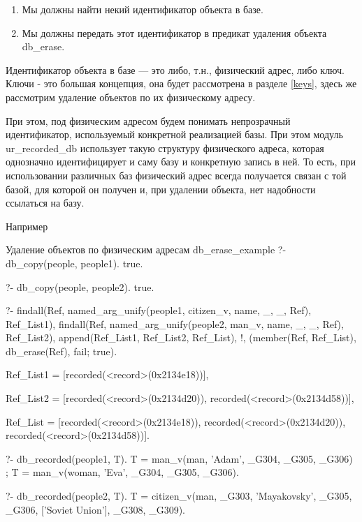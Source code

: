 \documentclass[a4paper]{book}
\def\tn{т.\thinspace н.}
\begin{document}
\begin{enumerate}
\item Мы должны найти некий идентификатор объекта в базе.
\item Мы должны передать этот идентификатор в предикат удаления
  объекта db\_erase.
\end{enumerate}

Идентификатор объекта в базе --- это либо, \tn, физический адрес,
либо ключ. Ключи - это большая концепция, она будет рассмотрена в
разделе \ref{keys}, здесь же рассмотрим удаление объектов по их
физическому адресу.

При этом, под физическим адресом будем понимать непрозрачный
идентификатор, используемый конкретной реализацией базы. При этом
модуль ur\_recorded\_db использует такую структуру физического
адреса, которая однозначно идентифицирует и саму базу и
конкретную запись в ней. То есть, при использовании различных баз
физический адрес всегда получается связан с той базой, для
которой он получен и, при удалении объекта, нет надобности
ссылаться на базу.

Например

\begin{bigexample}{Удаление объектов по физическим адресам}%
               {db_erase_example}
?- db_copy(people, people1).
true.

?- db_copy(people, people2).
true.

?- findall(Ref, 
           named_arg_unify(people1, citizen_v, name, _, _, Ref), 
           Ref_List1), 
   findall(Ref, 
           named_arg_unify(people2, man_v, name, _, _, Ref), 
           Ref_List2), 
   append(Ref_List1, Ref_List2, Ref_List), 
   !, 
   (member(Ref, Ref_List), db_erase(Ref), fail; true).

Ref_List1 = [recorded(<record>(0x2134e18))],

Ref_List2 = [recorded(<record>(0x2134d20)), 
             recorded(<record>(0x2134d58))],

Ref_List = [recorded(<record>(0x2134e18)), 
            recorded(<record>(0x2134d20)), 
            recorded(<record>(0x2134d58))].

?- db_recorded(people1, T).
T = man_v(man, 'Adam', _G304, _G305, _G306) ;
T = man_v(woman, 'Eva', _G304, _G305, _G306).

?- db_recorded(people2, T).                                        
T = citizen_v(man, _G303, 'Mayakovsky', _G305, _G306, 
              ['Soviet Union'], _G308, _G309).
\end{bigexample}
\end{document}
